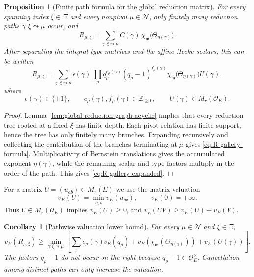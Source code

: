 \documentclass[12pt]{article}
\newtheorem{proposition}[theorem]{Proposition}
\newtheorem{corollary}[theorem]{Corollary}
\theoremstyle{definition}
\theoremstyle{remark}
\newcommand{\Ocoeff}{\mathcal O_E}
\begin{document}
\begin{proposition}[Finite path formula for the global reduction matrix]
\label{prop:global-reduction-path-formula}
For every spanning index \(\xi\in\Xi\) and every nonpivot
\(\mu\in\mathscr N\), only finitely many reduction paths
\(\gamma:\xi\leadsto\mu\) occur, and
\begin{equation}\label{eq:R-gallery-formula}
 R_{\mu;\xi}
 =
 \sum_{\gamma:\xi\leadsto\mu}
 C(\gamma)\,
 \chi_{\mathfrak m}
 \bigl(\Theta_{\eta(\gamma)}\bigr).
\end{equation}
After separating the integral type matrices and the affine-Hecke scalars,
this can be written
\begin{equation}\label{eq:R-gallery-expanded}
 R_{\mu;\xi}
 =
 \sum_{\gamma:\xi\leadsto\mu}
 \epsilon(\gamma)\,
 \prod_\rho q_\rho^{c_\rho(\gamma)}
 (q_\rho-1)^{f_\rho(\gamma)}
 \chi_{\mathfrak m}
 \bigl(\Theta_{\eta(\gamma)}\bigr)
 U(\gamma),
\end{equation}
where
\[
 \epsilon(\gamma)\in\{\pm1\},
 \qquad
 c_\rho(\gamma),f_\rho(\gamma)\in\mathbb Z_{\geq0},
 \qquad
 U(\gamma)\in M_r(\Ocoeff).
\]
\end{proposition}

\begin{proof}
Lemma~\ref{lem:global-reduction-graph-acyclic} implies that every reduction
tree rooted at a fixed \(\xi\) has finite depth.  Each pivot relation has
finite support, hence the tree has only finitely many branches.  Expanding
recursively and collecting the contribution of the branches terminating at
\(\mu\) gives \eqref{eq:R-gallery-formula}.  Multiplicativity of Bernstein
translations gives the accumulated exponent \(\eta(\gamma)\), while the
remaining scalar and type factors multiply in the order of the path.  This
gives \eqref{eq:R-gallery-expanded}.
\end{proof}

For a matrix \(U=(u_{ab})\in M_r(E)\) we use the matrix valuation
\begin{equation}\label{eq:matrix-valuation-definition}
 v_E(U)=\min_{a,b}v_E(u_{ab}),
 \qquad v_E(0)=+\infty.
\end{equation}
Thus \(U\in M_r(\Ocoeff)\) implies \(v_E(U)\geq0\), and
\(v_E(UV)\geq v_E(U)+v_E(V)\).

\begin{corollary}[Pathwise valuation lower bound]
\label{cor:global-reduction-path-valuation}
For every \(\mu\in\mathscr N\) and \(\xi\in\Xi\),
\begin{equation}\label{eq:R-valuation-lower-bound}
 v_E(R_{\mu;\xi})
 \geq
 \min_{\gamma:\xi\leadsto\mu}
 \left[
 \sum_\rho c_\rho(\gamma)v_E(q_\rho)
 +
 v_E\!\left(
 \chi_{\mathfrak m}(\Theta_{\eta(\gamma)})
 \right)
 +
 v_E(U(\gamma))
 \right].
\end{equation}
The factors \(q_\rho-1\) do not occur on the right because
\(q_\rho-1\in\Ocoeff^\times\).  Cancellation among distinct paths can only
increase the valuation.
\end{corollary}
\end{document}
